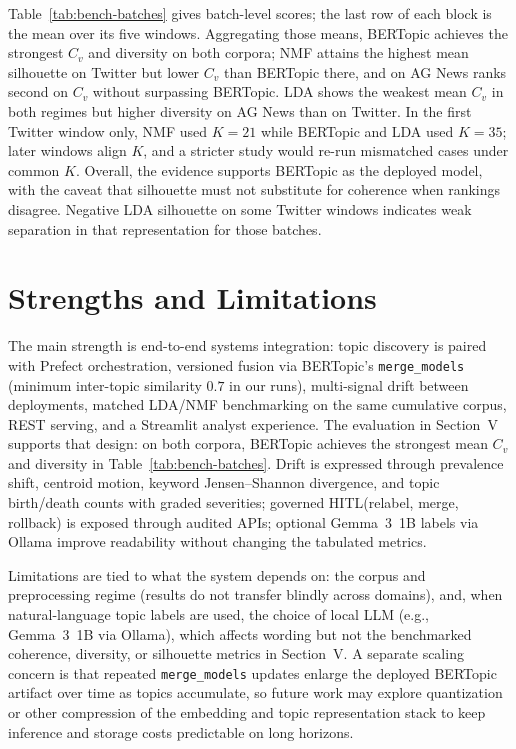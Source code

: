 \documentclass[conference]{IEEEtran}
\newcommand{\bertopic}{BERTopic\xspace}
\newcommand{\lda}{LDA\xspace}
\newcommand{\nmf}{NMF\xspace}
\newcommand{\hitl}{HITL\xspace}
\begin{document}
Table~\ref{tab:bench-batches} gives batch-level scores; the last row of each block is the mean over its five windows. Aggregating those means, \bertopic achieves the strongest $C_v$ and diversity on both corpora; \nmf attains the highest mean silhouette on Twitter but lower $C_v$ than \bertopic there, and on AG News ranks second on $C_v$ without surpassing \bertopic. \lda shows the weakest mean $C_v$ in both regimes but higher diversity on AG News than on Twitter. In the first Twitter window only, \nmf used $K{=}21$ while \bertopic and \lda used $K{=}35$; later windows align $K$, and a stricter study would re-run mismatched cases under common $K$. Overall, the evidence supports \bertopic as the deployed model, with the caveat that silhouette must not substitute for coherence when rankings disagree. Negative \lda silhouette on some Twitter windows indicates weak separation in that representation for those batches.

\section{Strengths and Limitations}
The main strength is end-to-end systems integration: topic discovery is paired with Prefect orchestration, versioned fusion via \bertopic's \texttt{merge\_models} (minimum inter-topic similarity $0.7$ in our runs), multi-signal drift between deployments, matched \lda/\nmf benchmarking on the same cumulative corpus, REST serving, and a Streamlit analyst experience. The evaluation in Section~V supports that design: on both corpora, \bertopic achieves the strongest mean $C_v$ and diversity in Table~\ref{tab:bench-batches}. Drift is expressed through prevalence shift, centroid motion, keyword Jensen--Shannon divergence, and topic birth/death counts with graded severities; governed \hitl (relabel, merge, rollback) is exposed through audited APIs; optional Gemma~3~1B labels via Ollama improve readability without changing the tabulated metrics.

Limitations are tied to what the system depends on: the corpus and preprocessing regime (results do not transfer blindly across domains), and, when natural-language topic labels are used, the choice of local LLM (e.g., Gemma~3~1B via Ollama), which affects wording but not the benchmarked coherence, diversity, or silhouette metrics in Section~V. A separate scaling concern is that repeated \texttt{merge\_models} updates enlarge the deployed \bertopic artifact over time as topics accumulate, so future work may explore quantization or other compression of the embedding and topic representation stack to keep inference and storage costs predictable on long horizons.
\end{document}
